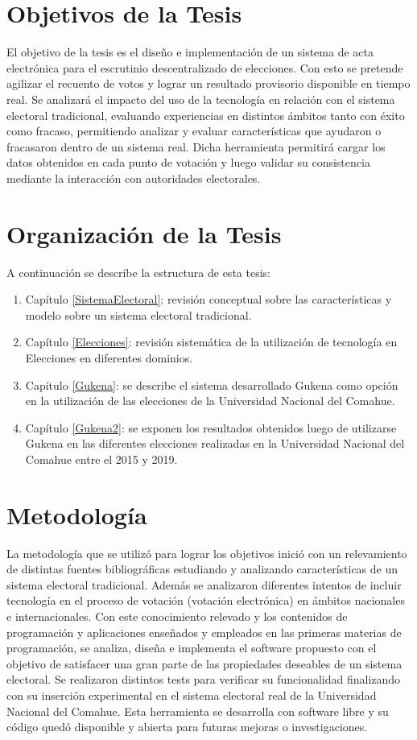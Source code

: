 \section{Objetivos de la Tesis}
El objetivo de la tesis es el diseño e implementación de un sistema de acta electrónica para el escrutinio descentralizado de elecciones. Con esto se pretende agilizar el recuento de votos y lograr un resultado provisorio disponible en tiempo real. Se analizará el impacto del uso de la tecnología en relación con el sistema electoral tradicional, evaluando experiencias en distintos ámbitos tanto con éxito como fracaso, permitiendo analizar y evaluar características que ayudaron o fracasaron dentro de un sistema real.\newline
Dicha herramienta permitirá cargar los datos obtenidos en cada punto de votación y luego validar su consistencia mediante la interacción con autoridades electorales. 

\section{Organización de la Tesis}
A continuación se describe la estructura de esta tesis:
\begin{enumerate}
    \item Capítulo \ref{SistemaElectoral}: revisión conceptual sobre las características y modelo sobre un sistema electoral tradicional.
    \item Capítulo \ref{Elecciones}: revisión sistemática de la utilización de tecnología en  Elecciones en diferentes dominios.
    \item Capítulo \ref{Gukena}: se describe el sistema desarrollado Gukena como opción en la utilización de las elecciones de la Universidad Nacional del Comahue.
    \item Capítulo \ref{Gukena2}: se exponen los resultados obtenidos luego de utilizarse Gukena en las diferentes elecciones realizadas en la Universidad Nacional del Comahue entre el 2015 y 2019.
\end{enumerate}

\section{Metodología}
La metodología que se utilizó para lograr los objetivos inició con un relevamiento de distintas fuentes bibliográficas estudiando y analizando características de un sistema electoral tradicional.
Además se analizaron diferentes intentos de incluir tecnología en el proceso de votación (votación electrónica) en ámbitos nacionales e internacionales. Con este conocimiento relevado y los contenidos de programación y aplicaciones enseñados y empleados en las primeras materias de programación, se analiza, diseña e implementa el software propuesto con el objetivo de satisfacer una gran parte de las propiedades deseables de un sistema electoral. Se realizaron distintos tests para verificar su funcionalidad finalizando con su inserción experimental en el sistema electoral real de la Universidad Nacional del Comahue. Esta herramienta se desarrolla con software libre y su código quedó disponible y abierta para futuras mejoras o investigaciones.


